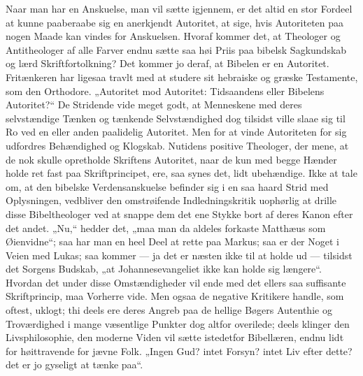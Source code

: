 \documentclass[12pt,a4paper]{book}
\begin{document}
Naar man har en Anskuelse, man vil sætte igjennem, er det altid en stor Fordeel at kunne
paaberaabe sig en anerkjendt Autoritet, at sige, hvis Autoriteten paa nogen Maade kan vindes
for Anskuelsen. Hvoraf kommer det, at Theologer og Antitheologer af alle Farver endnu sætte
saa høi Priis paa bibelsk Sagkundskab
og lærd Skriftfortolkning? Det kommer jo deraf, at Bibelen er en Autoritet. Fritænkeren har
ligesaa travlt med at studere sit hebraiske og græske Testamente, som den Orthodore.
„Autoritet mod Autoritet: Tidsaandens eller Bibelens Autoritet?“ De Stridende vide meget
godt, at Menneskene med deres selvstændige Tænken og tænkende Selvstændighed dog tilsidst
ville slaae sig til Ro ved en eller anden paalidelig Autoritet. Men for at vinde Autoriteten
for sig udfordres Behændighed og Klogskab. Nutidens positive Theologer, der mene, at de nok
skulle opretholde Skriftens Autoritet, naar de kun med begge Hænder holde ret fast paa
Skriftprincipet, ere, saa synes det, lidt ubehændige. Ikke at tale om, at den bibelske
Verdensanskuelse befinder sig i en saa haard Strid med Oplysningen, vedbliver den
omstrøifende Indledningskritik uophørlig at drille disse Bibeltheologer ved at snappe dem
det ene Stykke bort af deres Kanon efter det andet. „Nu,“ hedder det, „maa man da aldeles
forkaste Matthæus som Øienvidne“; saa har man en heel Deel at rette paa Markus; saa er der
Noget i Veien med Lukas; saa kommer --- ja det er næsten ikke til at holde ud --- tilsidst
det Sorgens Budskab, „at Johannesevangeliet ikke kan holde sig længere“. Hvordan det under
disse Omstændigheder vil ende med det ellers saa suffisante Skriftprincip, maa Vorherre vide.
Men ogsaa de negative Kritikere handle, som oftest, uklogt; thi deels ere deres Angreb paa
de hellige Bøgers Autenthie og Troværdighed i mange væsentlige Punkter dog altfor overilede;
deels klinger den Livsphilosophie, den moderne Viden vil sætte istedetfor Bibellæren, endnu
lidt for høittravende for jævne Folk. „Ingen Gud? intet Forsyn? intet Liv efter dette? det er
jo gyseligt at tænke paa“.
\end{document}

